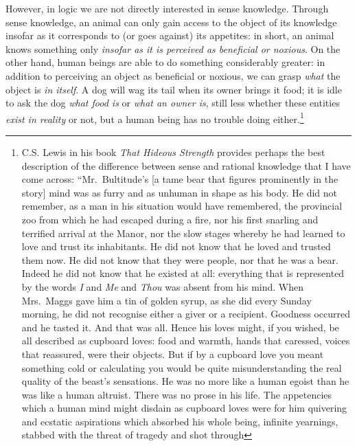 \documentclass[article,12pt,a4paper,oneside]{memoir}
\begin{document}
    However, in logic we are not directly interested in sense knowledge.
    Through sense knowledge, an animal can only gain access to the
    object of its knowledge insofar as it corresponds to (or goes
    against) its appetites: in short, an animal knows something only
    \emph{insofar as it is perceived as beneficial or noxious}. On the
    other hand, human beings are able to do something considerably
    greater: in addition to perceiving an object as beneficial or
    noxious, we can grasp \emph{what} the object is \emph{in itself}. A
    dog will wag its tail when its owner brings it food; it is idle to
    ask the dog \emph{what food is} or \emph{what an owner is}, still
    less whether these entities \emph{exist in reality} or not, but a
    human being has no trouble doing either.\footnote{C.S. Lewis in his
      book \emph{That Hideous Strength} provides perhaps the best
      description of the difference between sense and rational knowledge
      that I have come across: ``Mr.~Bultitude's {[}a tame bear that
      figures prominently in the story{]} mind was as furry and as
      unhuman in shape as his body. He did not remember, as a man in his
      situation would have remembered, the provincial zoo from which he
      had escaped during a fire, nor his first snarling and terrified
      arrival at the Manor, nor the slow stages whereby he had learned
      to love and trust its inhabitants. He did not know that he loved
      and trusted them now. He did not know that they were people, nor
      that he was a bear. Indeed he did not know that he existed at all:
      everything that is represented by the words \emph{I} and \emph{Me}
      and \emph{Thou} was absent from his mind. When Mrs.~Maggs gave him
      a tin of golden syrup, as she did every Sunday morning, he did not
      recognise either a giver or a recipient. Goodness occurred and he
      tasted it. And that was all. Hence his loves might, if you wished,
      be all described as cupboard loves: food and warmth, hands that
      caressed, voices that reassured, were their objects. But if by a
      cupboard love you meant something cold or calculating you would be
      quite misunderstanding the real quality of the beast's sensations.
      He was no more like a human egoist than he was like a human
      altruist. There was no prose in his life. The appetencies which a
      human mind might disdain as cupboard loves were for him quivering
      and ecstatic aspirations which absorbed his whole being, infinite
      yearnings, stabbed with the threat of tragedy and shot through
}
\end{document}
